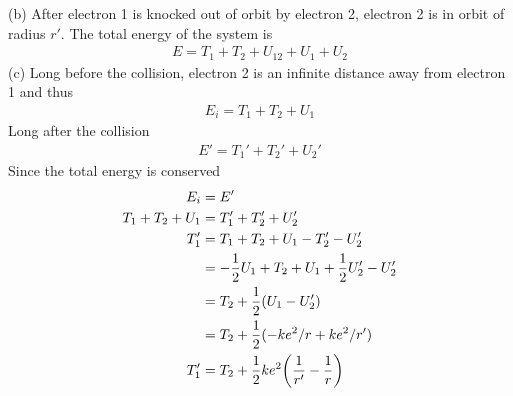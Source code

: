\documentclass[../problems.tex]{subfiles}
\begin{document}
(b) After electron 1 is knocked out of orbit by electron 2, electron 2 is in orbit of radius $r'$.
The total energy of the system is
\begin{align*}
    E = T_1 + T_2 + U_{12} + U_1 + U_2
\end{align*}
(c) Long before the collision, electron 2 is an infinite distance away from electron 1 and thus
\begin{align*}
    E_i = T_1 + T_2 + U_1 
\end{align*}
Long after the collision
\begin{align*}
    E' = T_1' + T_2' + U_2'
\end{align*}
Since the total energy is conserved
\begin{align*}
    E_i &= E' \\
    T_1 + T_2 + U_1 &= T_1' + T_2' + U_2' \\
    T_1' &= T_1 + T_2 + U_1 - T_2' - U_2' \\
    &= -\frac{1}{2} U_1 + T_2 + U_1 + \frac{1}{2}U_2' - U_2' \\
    &= T_2 + \frac{1}{2} (U_1 - U_2') \\
    &= T_2 + \frac{1}{2} (-ke^2/r + ke^2/r') \\
    T_1' &= T_2 + \frac{1}{2} ke^2 \quantity(\frac{1}{r'} - \frac{1}{r})
\end{align*}
\end{document}
